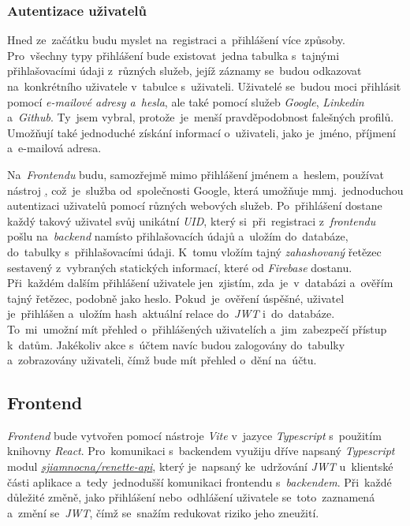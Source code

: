 \documentclass[10pt,a4paper]{article}
\begin{document}
            \subsubsection{Autentizace uživatelů}
            Hned ze~začátku budu myslet na~registraci a~přihlášení více způsoby. Pro~všechny typy přihlášení bude existovat~jedna tabulka s~tajnými přihlašovacími údaji z~různých služeb, jejíž záznamy se~budou odkazovat na~konkrétního uživatele v~tabulce s~uživateli. Uživatelé se~budou moci přihlásit pomocí \emph{e-mailové adresy a~hesla}, ale také pomocí služeb \emph{Google}, \emph{Linkedin} a~\emph{Github}. Ty~jsem vybral, protože~je~menší pravděpodobnost falešných profilů. Umožňují také jednoduché získání informací o~uživateli, jako je~jméno, příjmení a~e-mailová adresa.
            
            Na~\emph{Frontendu} budu, samozřejmě mimo přihlášení jménem a~heslem, používat nástroj \href{Firebase}, což~je~služba od~společnosti Google, která umožňuje mmj.~jednoduchou autentizaci uživatelů pomocí různých webových služeb. Po~přihlášení dostane každý takový uživatel svůj unikátní \emph{UID}, který si~při~registraci z~\emph{frontendu} pošlu na~\emph{backend} namísto přihlašovacích údajů a~uložím do~databáze, do~tabulky s~přihlašovacími údaji. K~tomu vložím tajný \emph{zahashovaný} řetězec sestavený z~vybraných statických informací, které od \emph{Firebase} dostanu. Při~každém dalším přihlášení uživatele jen~zjistím, zda~je~v~databázi a~ověřím tajný řetězec, podobně jako heslo. Pokud~je~ověření úspěšné, uživatel je~přihlášen a~uložím hash~aktuální relace do~\emph{JWT} i~do~databáze. To~mi~umožní mít přehled o~přihlášených uživatelích a~jim~zabezpečí přístup k~datům. Jakékoliv akce s~účtem navíc budou zalogovány do~tabulky a~zobrazovány uživateli, čímž bude mít přehled o~dění na~účtu.

        \subsection{Frontend}
            \emph{Frontend} bude vytvořen pomocí nástroje \emph{Vite} v~jazyce \emph{Typescript} s~použitím knihovny \emph{React}. Pro~komunikaci s~backendem využiju dříve napsaný \emph{Typescript} modul \href{https://gitlab.com/sjiamnocna/renette-api}{\emph{sjiamnocna/renette-api}}, který je~napsaný ke~udržování \emph{JWT} u~klientské části aplikace a~tedy~jednodušší komunikaci frontendu s~\emph{backendem}. Při~každé důležité změně, jako přihlášení nebo~odhlášení uživatele se~toto~zaznamená a~změní se~\emph{JWT}, čímž se~snažím redukovat riziko jeho zneužití.
\end{document}
